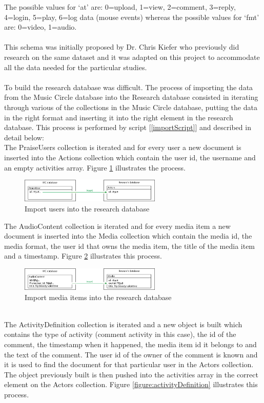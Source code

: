 \documentclass[11pt, oneside]{article}   	%
\begin{document}
The possible values for `at' are: 0=upload, 1=view, 2=comment, 3=reply, 4=login, 5=play, 6=log data (mouse events) whereas the possible values for `fmt' are: 0=video, 1=audio.\\\\
This schema was initially proposed by Dr. Chris Kiefer who previously did research on the same dataset and it was adapted on this project to accommodate all the data needed for the particular studies.\\\\
To build the research database was difficult. The process of importing the data from the Music Circle database into the Research database consisted in iterating through various of the collections in the Music Circle database, putting the data in the right format and inserting it into the right element in the research database. This process is performed by script [\ref{importScript}] and described in detail below:\\
The PraiseUsers collection is iterated and for every user a new document is inserted into the Actions collection which contain the user id, the username and an empty activities array. Figure \ref{figure:praiseUserImport} illustrates the process.
\begin{figure}[h!]
  \centering
    \includegraphics[width=0.6\textwidth]{./praiseUser.png}
      \caption{Import users into the research database}
      \label{figure:praiseUserImport}
\end{figure}
\newpage
\noindent
The AudioContent collection is iterated and for every media item a new document is inserted into the Media collection which contain the media id, the media format, the user id that owns the media item, the title of the media item and a timestamp. Figure \ref{figure:media} illustrates this process.
\begin{figure}[h]
  \centering
    \includegraphics[width=0.6\textwidth]{./media.png}
      \caption{Import media items into the research database}
      \label{figure:media}
\end{figure}
\\The ActivityDefinition collection is iterated and a new object is built which contains the type of activity (comment activity in this case), the id of the comment, the timestamp when it happened, the media item id it belongs to and the text of the comment. The user id of the owner of the comment is known and it is used to find the document for that particular user in the Actors collection. The object previously built is then pushed into the activities array in the correct element on the Actors collection. Figure \ref{figure:activityDefinition} illustrates this process.
\end{document}
